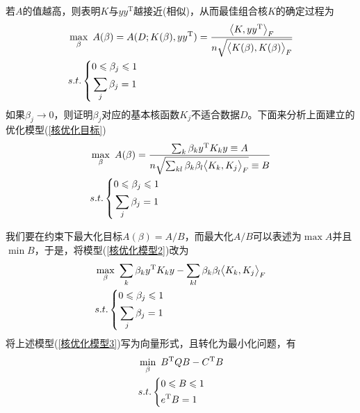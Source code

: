         \par
        若$A$的值越高，则表明$K$与$yy^\mathrm{T}$越接近(相似)，从而最佳组合核$K$的确定过程为
        \begin{align}
        \label{核优化目标}
        &\max_\beta \ A(\beta) = A(D;K(\beta),yy^\mathrm{T}) = \frac{\bigl< K,yy^\mathrm{T}\bigr>_F}{n \sqrt{\bigl< K(\beta),K(\beta) \bigr>_F}}\notag\\
        &s.t.
        \left\{
        \begin{aligned}
        & 0 \leqslant \beta_j \leqslant 1\\
        & \sum_j \beta_j = 1
        \end{aligned}
        \right.
        \end{align}
        如果$\beta_j\rightarrow 0$，则证明$\beta_j$对应的基本核函数$K_j$不适合数据$D$。下面来分析上面建立的优化模型(\ref{核优化目标})
        \begin{align}
        \label{核优化模型2}
        &\max_\beta \ A(\beta) =  \frac{\sum_k\beta_ky^\mathrm{T}K_k y \equiv A}{n \sqrt{\sum_{kl}\beta_k\beta_l  \bigl< K_k,K_j \bigr>_F} \equiv B}\notag\\
        &s.t.
        \left\{
        \begin{aligned}
        & 0 \leqslant \beta_j \leqslant 1\\
        & \sum_j \beta_j = 1
        \end{aligned}
        \right.
        \end{align}
        \par
        我们要在约束下最大化目标$A(\beta) = A/B$，而最大化$A/B$可以表述为$\max A$并且$\min B$，于是，将模型(\ref{核优化模型2})改为
        \begin{align}
        \label{核优化模型3}
        &\max_\beta  \ \sum_k\beta_k y^\mathrm{T} K_ky - \sum_{kl}\beta_k\beta_l  \bigl< K_k,K_j \bigr>_F \notag\\
        &s.t.
        \left\{
        \begin{aligned}
        & 0 \leqslant \beta_j \leqslant 1\\
        & \sum_j \beta_j = 1
        \end{aligned}
        \right.
        \end{align}
        将上述模型(\ref{核优化模型3})写为向量形式，且转化为最小化问题，有
        \begin{align}
        \label{核优化模型向量形式}
        &\min_\beta  \ B^\mathrm{T}QB - C^\mathrm{T}B \notag\\
        &s.t.
        \left\{
        \begin{aligned}
        & 0 \leqslant B \leqslant 1\\
        & e^\mathrm{T} B = 1
        \end{aligned}
        \right.
        \end{align}
